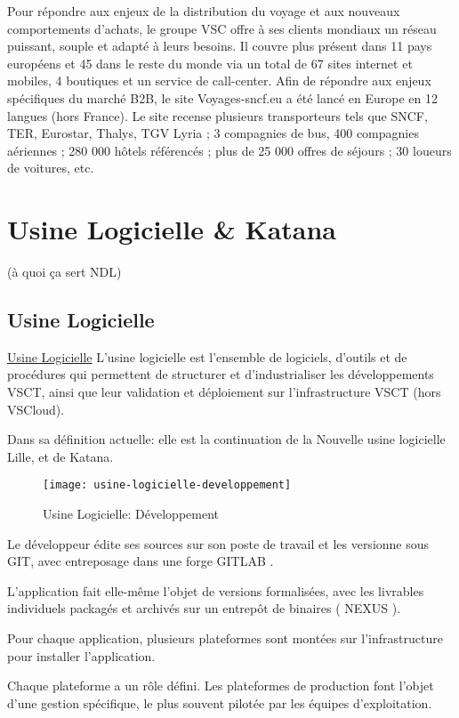 Pour répondre aux enjeux de la distribution du voyage et aux nouveaux comportements d’achats, le groupe VSC offre à ses clients mondiaux un réseau puissant, souple et adapté à leurs besoins. Il couvre plus présent dans 11 pays européens et 45 dans le reste du monde via un total de 67 sites internet et mobiles, 4 boutiques et un service de call-center. Afin de répondre aux enjeux spécifiques du marché B2B, le site Voyages-sncf.eu a été lancé en Europe en 12 langues (hors France).
Le site recense plusieurs transporteurs tels que SNCF, TER, Eurostar, Thalys, TGV Lyria ; 3 compagnies de bus, 400 compagnies aériennes ; 280 000 hôtels référencés ; plus de 25 000 offres de séjours ; 30 loueurs de voitures, etc.
\clearpage

\section{Usine Logicielle \& Katana} (à quoi ça sert NDL)
\subsection{Usine Logicielle}
\href{https://wiki.vsct.fr/pages/viewpage.action?spaceKey=KTN\&title=Usine+Logicielle+VSCT}{Usine Logicielle}
L'usine logicielle est l'ensemble de logiciels, d'outils et de procédures qui permettent de structurer et d'industrialiser les développements VSCT, ainsi que leur validation et déploiement sur l'infrastructure VSCT (hors VSCloud).

Dans sa définition actuelle: elle est la continuation de la Nouvelle usine logicielle Lille, et de Katana.

\begin{figure}[h]
\centering
\texttt{[image: usine-logicielle-developpement]}
\caption{Usine Logicielle: Développement}
\end{figure}

Le développeur édite ses sources sur son poste de travail et les versionne sous GIT, avec entreposage dans une forge GITLAB .

L'application fait elle-même l'objet de versions formalisées, avec les livrables individuels packagés et archivés sur un entrepôt de binaires ( NEXUS ).

Pour chaque application, plusieurs plateformes sont montées sur l'infrastructure pour installer l'application.

Chaque plateforme a un rôle défini. Les plateformes de production font l'objet d'une gestion spécifique, le plus souvent pilotée par les équipes d'exploitation.

